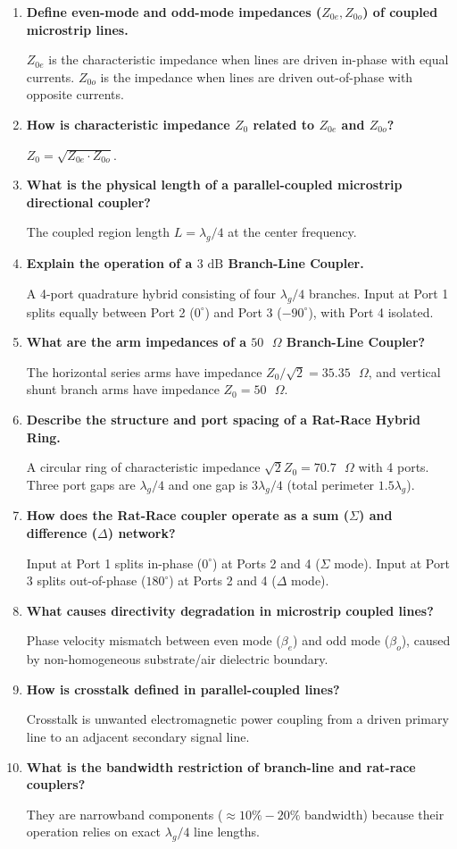 \documentclass[10pt,a4paper]{article}
\newcommand{\Q}[1]{\textbf{#1}\par\vspace{2pt}}
\begin{document}
\begin{tcolorbox}[exambox, title={\textbf{Frequently Asked / Viva Questions}}]
  \begin{enumerate}[topsep=0pt, label=\textbf{Q\arabic*.}, itemsep=5pt]
    \item \Q{Define even-mode and odd-mode impedances ($Z_{0e}, Z_{0o}$) of coupled microstrip lines.}
    $Z_{0e}$ is the characteristic impedance when lines are driven in-phase with equal currents. $Z_{0o}$ is the impedance when lines are driven out-of-phase with opposite currents.

    \item \Q{How is characteristic impedance $Z_0$ related to $Z_{0e}$ and $Z_{0o}$?}
    $Z_0 = \sqrt{Z_{0e} \cdot Z_{0o}}$.

    \item \Q{What is the physical length of a parallel-coupled microstrip directional coupler?}
    The coupled region length $L = \lambda_g/4$ at the center frequency.

    \item \Q{Explain the operation of a $3\text{ dB}$ Branch-Line Coupler.}
    A 4-port quadrature hybrid consisting of four $\lambda_g/4$ branches. Input at Port 1 splits equally between Port 2 ($0^\circ$) and Port 3 ($-90^\circ$), with Port 4 isolated.

    \item \Q{What are the arm impedances of a $50\text{ }\Omega$ Branch-Line Coupler?}
    The horizontal series arms have impedance $Z_0/\sqrt{2} = 35.35\text{ }\Omega$, and vertical shunt branch arms have impedance $Z_0 = 50\text{ }\Omega$.

    \item \Q{Describe the structure and port spacing of a Rat-Race Hybrid Ring.}
    A circular ring of characteristic impedance $\sqrt{2}Z_0 = 70.7\text{ }\Omega$ with 4 ports. Three port gaps are $\lambda_g/4$ and one gap is $3\lambda_g/4$ (total perimeter $1.5\lambda_g$).

    \item \Q{How does the Rat-Race coupler operate as a sum ($\Sigma$) and difference ($\Delta$) network?}
    Input at Port 1 splits in-phase ($0^\circ$) at Ports 2 and 4 ($\Sigma$ mode). Input at Port 3 splits out-of-phase ($180^\circ$) at Ports 2 and 4 ($\Delta$ mode).

    \item \Q{What causes directivity degradation in microstrip coupled lines?}
    Phase velocity mismatch between even mode ($\beta_e$) and odd mode ($\beta_o$), caused by non-homogeneous substrate/air dielectric boundary.

    \item \Q{How is crosstalk defined in parallel-coupled lines?}
    Crosstalk is unwanted electromagnetic power coupling from a driven primary line to an adjacent secondary signal line.

    \item \Q{What is the bandwidth restriction of branch-line and rat-race couplers?}
    They are narrowband components ($\approx 10\% - 20\%$ bandwidth) because their operation relies on exact $\lambda_g/4$ line lengths.
  \end{enumerate}
\end{tcolorbox}
\end{document}
